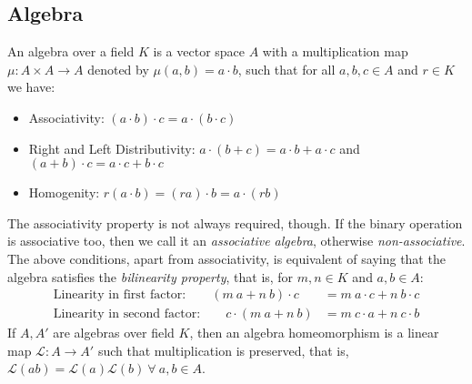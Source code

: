\begin{appendices}
\section{Algebra}
An algebra over a field $K$ is a vector space $A$ with a multiplication map $\mu : A\times A \rightarrow A$ denoted by $\mu(a,b) = a\cdot b$, such that for all $a,b,c\in A$ and $r\in K$ we have: 
\begin{itemize}
    \item Associativity: $(a\cdot b)\cdot c = a\cdot (b\cdot c)$ 
    \item Right and Left Distributivity: $a\cdot (b+c) = a\cdot b + a \cdot c$ and $(a+b)\cdot c = a\cdot c + b \cdot c$
    \item Homogenity: $r(a\cdot b) = (ra)\cdot b = a\cdot (rb)$
\end{itemize}
The associativity property is not always required, though. If the binary operation is associative too, then we call it an \textit{associative algebra}, otherwise \textit{non-associative}.\\[0.2cm] The above conditions, apart from associativity, is equivalent of saying that the algebra satisfies the \textit{bilinearity property}, that is, for $m,n \in K$ and $a,b\in A$:
\begin{align*}
    \text{Linearity in first factor:} \qquad (m\ a+n\ b)\cdot c &= m\ a\cdot c +n\ b\cdot c \\
    \text{Linearity in second factor:}\qquad  c \cdot (m\ a+n\ b)  &= m \ c\cdot a +n \ c\cdot b
\end{align*}
If $A,A'$ are algebras over field $K$, then an algebra homeomorphism is a linear map $\mathcal{L}: A\rightarrow A'$ such that multiplication is preserved, that is, $\mathcal{L}(ab) = \mathcal{L}(a)\mathcal{L}(b) \ \forall \ a,b \in A$. 
\end{appendices}